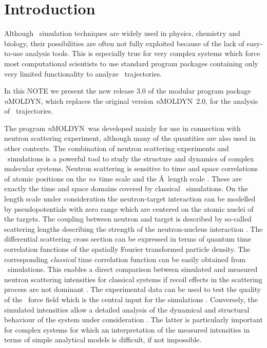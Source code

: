 \documentclass[a4paper,11pt]{report}
\newcommand{\ns}{\textit{ns}}
\newcommand{\NMOLDYN}{\textit{n}MOLDYN}
\begin{document}
\chapter{Introduction}
\label{global_introduction}

Although \MD\ simulation techniques are widely used in physics, chemistry and biology, their possibilities 
are often not fully exploited because of the lack of easy-to-use analysis tools. This is especially true for very complex 
systems which force most computational scientists to use standard program packages containing only very limited 
functionality to analyze \MD\ trajectories.

In this NOTE we present the new release 3.0 of the modular program package \NMOLDYN, which replaces the original version 
\NMOLDYN\ 2.0, for the analysis of \MD\ trajectories.

The program \NMOLDYN\ was developed mainly for use in connection with neutron scattering experiment, although many of 
the quantities are also used in other contexts. The combination of neutron scattering experiments and \MD\ 
simulations is a powerful tool to study the structure and dynamics of complex molecular systems. Neutron scattering 
is sensitive to time and space correlations of atomic positions on the \ns\ time scale and the \AA\, length scale 
\cite{Lovesey, Bee}. These are exactly the time and space domains covered by classical \MD\ simulations. 
On the length scale under consideration the neutron-target interaction can be modelled by pseudopotentials with zero range 
which are centered on the atomic nuclei of the targets. The coupling between neutron and target is described by so-called
scattering lengths describing the strength of the neutron-nucleus interaction \cite{Lovesey}.  The differential scattering 
cross section can be expressed in terms of quantum time correlation functions of the spatially Fourier transformed particle 
density. The corresponding \textit{classical} time correlation function can be easily obtained from \MD\ 
simulations.  This enables a direct comparison between simulated and measured neutron scattering intensities for classical 
systems if recoil effects in the scattering process are not dominant \cite{Kneller:1994}. The experimental data can be used 
to test the quality of the \MD\ force field which is the central input for the simulations \cite{Geiger:1989,Geiger:1990,Ahlrichs,Yip:1987}. 
Conversely, the simulated intensities allow a detailed analysis of the dynamical and structural behaviour of the system 
under consideration \cite{Smith:1992,Smith:1993}. The latter is particularly important for complex systems for which 
an interpretation of the measured intensities in terms of simple analytical models is difficult, if not impossible.
\end{document}
